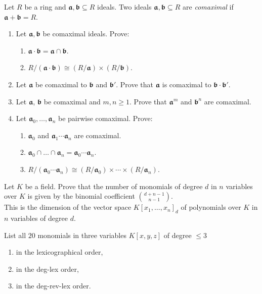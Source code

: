\documentclass{exercises}
\begin{document}
\begin{exercise}
  Let $R$ be a ring and $𝖆,𝖇⊆R$ ideals.
  Two ideals $𝖆,𝖇⊆R$ are \emph{comaximal} if $𝖆 + 𝖇 = R$.
  \begin{enumerate}
    \item Let $𝖆,𝖇$ be comaximal ideals.
      Prove:
      \begin{enumerate}
        \item $𝖆⋅𝖇 = 𝖆 ∩ 𝖇$.
        \item $R/(𝖆⋅𝖇) ≅ (R/𝖆) × (R/𝖇)$.
      \end{enumerate}
    \item Let $𝖆$ be comaximal to $𝖇$ and $𝖇'$.
      Prove that $𝖆$ is comaximal to $𝖇⋅𝖇'$.
    \item Let $𝖆$, $𝖇$ be comaximal and $m,n≥1$.
      Prove that $𝖆^m$ and $𝖇^n$ are comaximal.
    \item Let $𝖆_0,\dots,𝖆_n$ be pairwise comaximal.
      Prove:
      \begin{enumerate}
        \item $𝖆_0$ and $𝖆_1 \cdots 𝖆_n$ are comaximal.
        \item $𝖆_0∩\dots∩𝖆_n = 𝖆_0 \cdots 𝖆_n$.
        \item $R/(𝖆_0\cdots 𝖆_n) ≅ (R/𝖆_0) × \cdots × (R/𝖆_n)$.
      \end{enumerate}
  \end{enumerate}
\end{exercise}

\begin{exercise}
  Let $K$ be a field.
  Prove that the number of monomials of degree $d$ in $n$ variables over $K$ is given by the binomial coefficient $\binom{d+n-1}{n-1}$.\\
  {\scriptsize This is the dimension of the vector space $K[x_1,\dots,x_n]_d$ of polynomials over $K$ in $n$ variables of degree $d$.}
\end{exercise}

\begin{exercise}
  List all $20$ monomials in three variables $K[x,y,z]$ of degree $≤3$ 
  \begin{enumerate}
    \item in the lexicographical order,
    \item in the deg-lex order,
    \item in the deg-rev-lex order.
  \end{enumerate}
\end{exercise}
\end{document}
